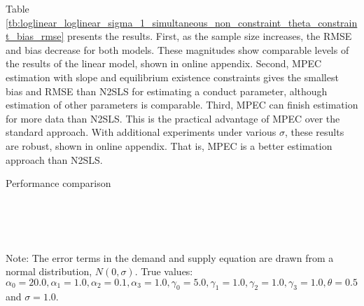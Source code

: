 \documentclass[11pt, a4paper]{article}
\begin{document}
Table \ref{tb:loglinear_loglinear_sigma_1_simultaneous_non_constraint_theta_constraint_bias_rmse} presents the results.
First, as the sample size increases, the RMSE and bias decrease for both models. 
These magnitudes show comparable levels of the results of the linear model, shown in online appendix. 
Second, MPEC estimation with slope and equilibrium existence constraints gives the smallest bias and RMSE than N2SLS for estimating a conduct parameter, although estimation of other parameters is comparable.
Third, MPEC can finish estimation for more data than N2SLS. 
This is the practical advantage of MPEC over the standard approach. 
With additional experiments under various $\sigma$, these results are robust, shown in online appendix. 
That is, MPEC is a better estimation approach than N2SLS.

\begin{table}[!htbp]
  \begin{center}
      \caption{Performance comparison}
      \label{tb:loglinear_loglinear_sigma_1_simultaneous_non_constraint_theta_constraint_bias_rmse} 
    \subfloat[N2SLS]{}\\
    \\
    \\
  \end{center}
  \footnotesize
  Note: The error terms in the demand and supply equation are drawn from a normal distribution, $N(0, \sigma)$. True values: $\alpha_0=20.0,\alpha_1=1.0,\alpha_2=0.1,\alpha_3=1.0,\gamma_0=5.0,\gamma_1=1.0,\gamma_2=1.0,\gamma_3=1.0,\theta=0.5$ and $\sigma=1.0$.
\end{table} 
\end{document}
